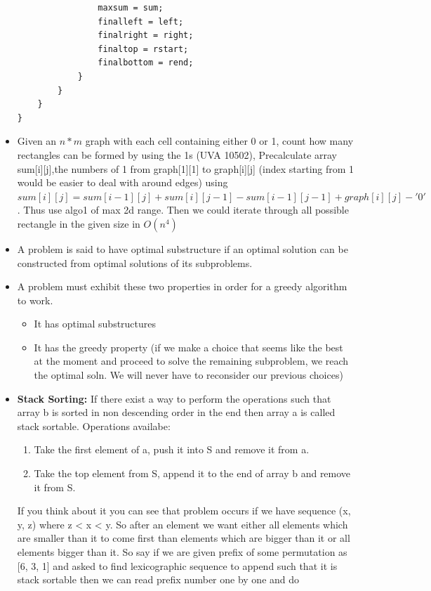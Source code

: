 \documentclass[8pt, a4paper, oneside, twocolumn]{extarticle}
\begin{document}
\begin{itemize}
\begin{verbatim}
                maxsum = sum;
                finalleft = left;
                finalright = right;
                finaltop = rstart;
                finalbottom = rend;
            } 
        }
    }
}
    \end{verbatim}
    \item Given an $n*m$ graph with each cell containing either 0 or 1, count how many rectangles can be formed by using the 1s (UVA 10502), Precalculate array sum[i][j],the numbers of 1 from graph[1][1] to graph[i][j] (index starting from 1 would be easier to deal with around edges) using $sum[i][j] = sum[i-1][j]+sum[i][j-1]-sum[i-1][j-1] + graph[i][j]-'0'$. Thus use algo1 of max 2d range.
    Then we could iterate through all possible rectangle in the given size in $O(n^4)$
    \item A problem is said to have optimal substructure if an optimal solution can be constructed from optimal solutions of its subproblems.
    \item A problem must exhibit these two properties in order for a greedy algorithm to work.
    \begin{itemize}
        \item It has optimal substructures
        \item It has the greedy property (if we make a choice that seems like the best at the moment and proceed to solve the remaining subproblem, we reach the optimal soln. We will never have to reconsider our previous choices)
    \end{itemize}
    \item \textbf{Stack Sorting: }If there exist a way to perform the operations such that array b is sorted in non descending order in the end then array a is called stack sortable. Operations availabe:
    \begin{enumerate}
        \item Take the first element of a, push it into S and remove it from a.
        \item Take the top element from S, append it to the end of array b and remove it from S.
    \end{enumerate}
    If you think about it you can see that problem occurs if we have sequence (x, y, z) where z < x < y. So after an element we want either all elements which are smaller than it to come first than elements which are bigger than it or all elements bigger than it. So say if we are given prefix of some permutation as [6, 3, 1] and asked to find lexicographic sequence to append such that it is stack sortable then we can read prefix number one by one and do\\

\end{itemize}
\end{document}
